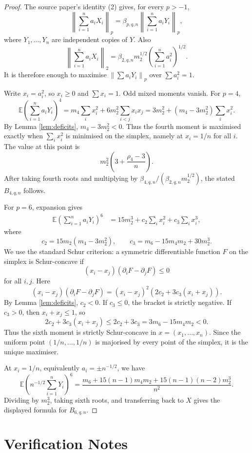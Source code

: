 \documentclass[11pt]{article}
\newcommand{\E}{\mathbb E}
\newcommand{\norm}[1]{\left\|#1\right\|}
\begin{document}
\begin{proof}
The source paper's identity (2) gives, for every \(p>-1\),
\[
\norm{\sum_{i=1}^n a_iX_i}_p
=\beta_{p,q,n}\norm{\sum_{i=1}^n a_iY_i}_p,
\]
where \(Y_1,\ldots,Y_n\) are independent copies of \(Y\).  Also
\[
\norm{\sum_{i=1}^n a_iX_i}_2
=\beta_{2,q,n}m_2^{1/2}\left(\sum_{i=1}^n a_i^2\right)^{1/2}.
\]
It is therefore enough to maximise \(\norm{\sum a_iY_i}_p\) over \(\sum a_i^2=1\).

Write \(x_i=a_i^2\), so \(x_i\ge0\) and \(\sum x_i=1\).  Odd mixed moments vanish.  For \(p=4\),
\[
\E\left(\sum_{i=1}^n a_iY_i\right)^4
=m_4\sum_i x_i^2+6m_2^2\sum_{i<j}x_ix_j
=3m_2^2+(m_4-3m_2^2)\sum_i x_i^2.
\]
By Lemma \ref{lem:deficits}, \(m_4-3m_2^2<0\).  Thus the fourth moment is maximised exactly when \(\sum_i x_i^2\) is minimised on the simplex, namely at \(x_i=1/n\) for all \(i\).  The value at this point is
\[
m_2^2\left(3+\frac{\rho_4-3}{n}\right).
\]
After taking fourth roots and multiplying by \(\beta_{4,q,n}/(\beta_{2,q,n}m_2^{1/2})\), the stated \(B_{4,q,n}\) follows.

For \(p=6\), expansion gives
\[
\begin{aligned}
\E\left(\sum_{i=1}^n a_iY_i\right)^6
&=15m_2^3
+c_2\sum_i x_i^2
+c_3\sum_i x_i^3,
\end{aligned}
\]
where
\[
c_2=15m_2(m_4-3m_2^2),
\qquad
c_3=m_6-15m_4m_2+30m_2^3.
\]
We use the standard Schur criterion: a symmetric differentiable function \(F\) on the simplex is Schur-concave if
\[
(x_i-x_j)(\partial_iF-\partial_jF)\le0
\]
for all \(i,j\).  Here
\[
(x_i-x_j)(\partial_iF-\partial_jF)
=(x_i-x_j)^2\left(2c_2+3c_3(x_i+x_j)\right).
\]
By Lemma \ref{lem:deficits}, \(c_2<0\).  If \(c_3\le0\), the bracket is strictly negative.  If \(c_3>0\), then \(x_i+x_j\le1\), so
\[
2c_2+3c_3(x_i+x_j)
\le 2c_2+3c_3
=3m_6-15m_4m_2<0.
\]
Thus the sixth moment is strictly Schur-concave in \(x=(x_1,\ldots,x_n)\).  Since the uniform point \((1/n,\ldots,1/n)\) is majorised by every point of the simplex, it is the unique maximiser.

At \(x_i=1/n\), equivalently \(a_i=\pm n^{-1/2}\), we have
\[
\E\left(n^{-1/2}\sum_{i=1}^n Y_i\right)^6
=\frac{m_6+15(n-1)m_4m_2+15(n-1)(n-2)m_2^3}{n^2}.
\]
Dividing by \(m_2^3\), taking sixth roots, and transferring back to \(X\) gives the displayed formula for \(B_{6,q,n}\).
\end{proof}

\section*{Verification Notes}
\end{document}
